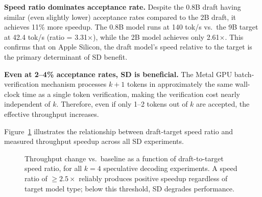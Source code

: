 \documentclass[11pt,a4paper]{article}
\begin{document}
\textbf{Speed ratio dominates acceptance rate.}
Despite the 0.8B draft having similar (even slightly lower) acceptance rates
compared to the 2B draft, it achieves 11\% more speedup.
The 0.8B model runs at 140 tok/s vs.\ the 9B target at 42.4 tok/s
(ratio = 3.31$\times$), while the 2B model achieves only 2.61$\times$.
This confirms that on Apple Silicon, the draft model's speed relative to the
target is the primary determinant of SD benefit.

\textbf{Even at 2--4\% acceptance rates, SD is beneficial.}
The Metal GPU batch-verification mechanism processes $k+1$ tokens in
approximately the same wall-clock time as a single token verification,
making the verification cost nearly independent of $k$.
Therefore, even if only 1--2 tokens out of $k$ are accepted, the effective
throughput increases.

Figure~\ref{fig:sd_speedratio} illustrates the relationship between draft-target
speed ratio and measured throughput speedup across all SD experiments.

\begin{figure}[h]
\centering
{}
\caption{Throughput change vs.\ baseline as a function of draft-to-target speed
ratio, for all $k=4$ speculative decoding experiments.
A speed ratio of $\geq 2.5\times$ reliably produces positive speedup regardless
of target model type; below this threshold, SD degrades performance.}
\label{fig:sd_speedratio}
\end{figure}
\end{document}
